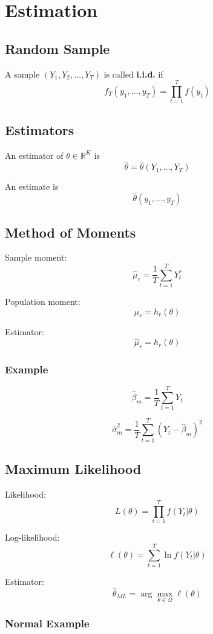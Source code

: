 \chapter{Estimation}

\section{Random Sample}

A sample $(Y_1, Y_2, \dots, Y_T)$ is called \textbf{i.i.d.} if
\[
f_T(y_1,\dots,y_T) = \prod_{t=1}^T f(y_t)
\]

\section{Estimators}

An estimator of $\theta \in \mathbb{R}^K$ is
\[
\hat{\theta} = \hat{\theta}(Y_1,\dots,Y_T)
\]

An estimate is
\[
\hat{\theta}(y_1,\dots,y_T)
\]

\section{Method of Moments}

Sample moment:
\[
\hat{\mu}_r = \frac{1}{T} \sum_{t=1}^T Y_t^r
\]

Population moment:
\[
\mu_r = h_r(\theta)
\]

Estimator:
\[
\hat{\mu}_r = h_r(\theta)
\]

\subsection{Example}

\[
\hat{\beta}_m = \frac{1}{T} \sum_{t=1}^T Y_t
\]

\[
\hat{\sigma}_m^2 = \frac{1}{T} \sum_{t=1}^T (Y_t - \hat{\beta}_m)^2
\]

\section{Maximum Likelihood}

Likelihood:
\[
L(\theta) = \prod_{t=1}^T f(Y_t|\theta)
\]

Log-likelihood:
\[
\ell(\theta) = \sum_{t=1}^T \ln f(Y_t|\theta)
\]

Estimator:
\[
\hat{\theta}_{ML} = \arg\max_{\theta \in \Omega} \ell(\theta)
\]

\subsection{Normal Example}


